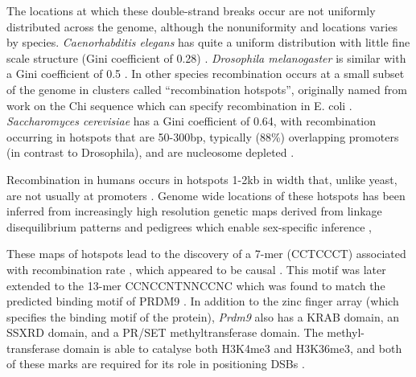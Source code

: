 The locations at which these double-strand breaks occur are not uniformly distributed across the genome, although the nonuniformity and locations varies by species. \textit{Caenorhabditis elegans} has quite a uniform distribution with little fine scale structure (Gini coefficient of 0.28) \parencite{Rockman2009Recombinational, Kaur2014Crossover}. \textit{Drosophila melanogaster} is similar with a Gini coefficient of 0.5 \parencite{Chan2012GenomeWide, SmukowskiHeil2015Recombining}. In other species recombination occurs at a small subset of the genome in clusters called ``recombination hotspots'', originally named from work on the Chi sequence which can specify recombination in E. coli \parencite{Lam1974RecMediated, Myers1994RecBC}. \textit{Saccharomyces cerevisiae} has a Gini coefficient of 0.64, with recombination occurring in hotspots that are 50-300bp, typically (88\%) overlapping promoters (in contrast to Drosophila), and are nucleosome depleted \parencite{Baudat1997Clustering, Wu1994Meiosisinduced, Mancera2008Highresolution, Pan2011Hierarchical, Lam2015Nonparadoxical}.

Recombination in humans occurs in hotspots 1-2kb in width that, unlike yeast, are not usually at promoters \parencite{Jeffreys2001Intensely}. Genome wide locations of these hotspots has been inferred from increasingly high resolution genetic maps derived from linkage disequilibrium patterns \parencite{McVean2004finescale, Myers2005FineScale, TheInternationalHapMapConsortium2007second, Coop2008HighResolution} and pedigrees which enable sex-specific inference \parencite{Kong2002highresolution, Kong2010Finescale, Kong2014Common, Bherer2017Refined, Halldorsson2019Characterizing},

These maps of hotspots lead to the discovery of a 7-mer (CCTCCCT) associated with recombination rate \parencite{Myers2005FineScale}, which appeared to be causal \parencite{Jeffreys2002Reciprocal}. This motif was later extended to the 13-mer CCNCCNTNNCCNC \parencite{Myers2008common} which was found to match the predicted binding motif of PRDM9 \parencite{Myers2010Drive, Baudat2010PRDM9, Parvanov2010Prdm9, Berg2010PRDM9}. In addition to the zinc finger array (which specifies the binding motif of the protein), \textit{Prdm9} also has a KRAB domain, an SSXRD domain, and a PR/SET methyltransferase domain. The methyl-transferase domain is able to catalyse both H3K4me3 and H3K36me3, and both of these marks are required for its role in positioning DSBs \parencite{Powers2016Meiotic, Diagouraga2018PRDM9}.

